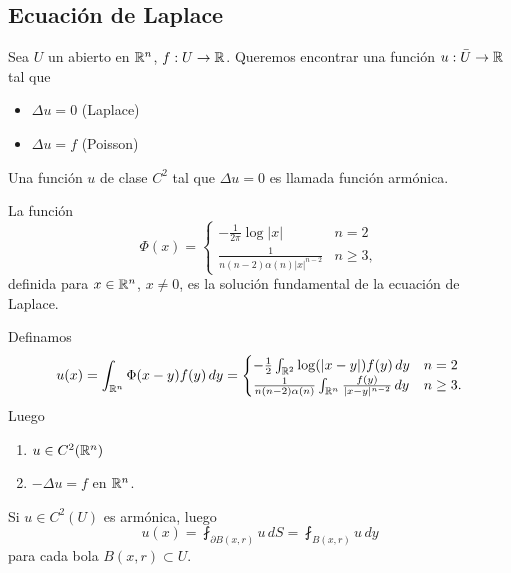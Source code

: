 \subsection{Ecuaci\'on de Laplace}

Sea $U$ un abierto en $\mathbb R^n$, $f: U \to \mathbb R$.
Queremos encontrar una funci\'on $u: \bar U \to \mathbb R$ tal que

\begin{itemize}
  \item $\Delta u = 0$ (Laplace)
  \item $\Delta u = f$ (Poisson)
\end{itemize}

\begin{defn}
  Una funci\'on $u$ de clase $C^2$ tal que $\Delta u = 0$ es llamada
  funci\'on arm\'onica.
\end{defn}

\begin{defn}
  La funci\'on
  \[
    \Phi (x) = \begin{cases}
      -\frac{1}{2 \pi} \log|x| & n = 2\\
      \frac{1}{n(n - 2)\alpha(n)|x|^{n - 2}} & n \geq 3,
    \end{cases} 
  \]
  definida para $x \in \mathbb R^n$, $x \neq 0$, es la soluci\'on fundamental de la ecuaci\'on de Laplace.
\end{defn}

\begin{theorem}
  Definamos
  \[
    u(x) = \int_{\mathbb R^n} \Phi(x - y) f(y)\, dy = \begin{cases}
      -\frac{1}{2} \int_{\mathbb R^2} \log(|x - y|)f(y)\, dy & n = 2\\
      \frac{1}{n(n - 2)\alpha(n)} \int_{\mathbb R^n} \frac{f(y)}{|x - y|^{n - 2}}\, dy & n \geq 3.
    \end{cases}
  \]
  Luego
  \begin{enumerate}
    \item $u \in C^2(\mathbb R^n)$
    \item $-\Delta u = f$ en $\mathbb R^n$.
  \end{enumerate}
\end{theorem}

\begin{theorem}
  Si $u \in C^2(U)$ es arm\'onica, luego
  \[
    u(x) = \fint_{\partial B(x, r)} u\, dS = \fint_{B(x, r)} u\, dy
  \]
  para cada bola $B(x, r) \subset U$.
\end{theorem}

